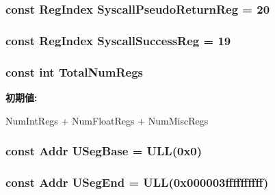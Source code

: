 \label{namespaceAlphaISA_a208b182e71958af642826cde032dcd60}
\hypertarget{namespaceAlphaISA_a6b71a09200f90f7292045d3560f10dad}{
\subsubsection[{SyscallPseudoReturnReg}]{\setlength{\rightskip}{0pt plus 5cm}const {\bf RegIndex} {\bf SyscallPseudoReturnReg} = 20}}
\label{namespaceAlphaISA_a6b71a09200f90f7292045d3560f10dad}
\hypertarget{namespaceAlphaISA_a6c8c50158f99f454a2f011a1806f76c2}{
\subsubsection[{SyscallSuccessReg}]{\setlength{\rightskip}{0pt plus 5cm}const {\bf RegIndex} {\bf SyscallSuccessReg} = 19}}
\label{namespaceAlphaISA_a6c8c50158f99f454a2f011a1806f76c2}
\hypertarget{namespaceAlphaISA_a578a3508d56f10e933ba9559e2cf907c}{
\subsubsection[{TotalNumRegs}]{\setlength{\rightskip}{0pt plus 5cm}const int {\bf TotalNumRegs}}}
\label{namespaceAlphaISA_a578a3508d56f10e933ba9559e2cf907c}
{\bfseries 初期値:}
\begin{DoxyCode}

    NumIntRegs + NumFloatRegs + NumMiscRegs
\end{DoxyCode}
\hypertarget{namespaceAlphaISA_a9d54e751f7acdb2ea3b820539047d085}{
\subsubsection[{USegBase}]{\setlength{\rightskip}{0pt plus 5cm}const {\bf Addr} {\bf USegBase} = ULL(0x0)}}
\label{namespaceAlphaISA_a9d54e751f7acdb2ea3b820539047d085}
\hypertarget{namespaceAlphaISA_a42b44a1d23d813c474aef63cd9c7a729}{
\subsubsection[{USegEnd}]{\setlength{\rightskip}{0pt plus 5cm}const {\bf Addr} {\bf USegEnd} = ULL(0x000003ffffffffff)}}
